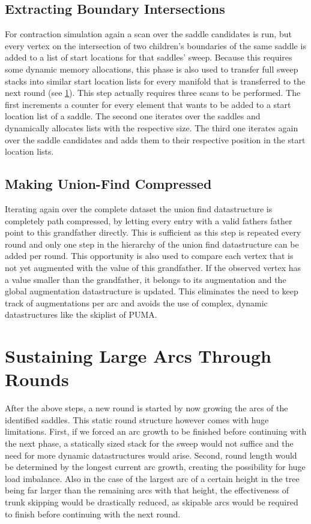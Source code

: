\documentclass[%
	paper=A4,					%
	twoside=true,				%
	openright,					%
	parskip=full,				%
	chapterprefix=true,			%
	11pt,						%
	headings=normal,			%
	bibliography=totoc,			%
	listof=totoc,				%
	titlepage=on,				%
	captions=tableabove,		%
	draft=false,				%
]{scrreprt}%
\begin{document}
\subsection{Extracting Boundary Intersections}
For contraction simulation again a scan over the saddle candidates is run, but every vertex on the intersection of two children's boundaries of the same saddle is added to a list of start locations for that saddles' sweep. Because this requires some dynamic memory allocations, this phase is also used to transfer full sweep stacks into similar start location lists for every manifold that is transferred to the next round (see \ref{ssec:num2}). This step actually requires three scans to be performed. The first increments a counter for every element that wants to be added to a start location list of a saddle. The second one iterates over the saddles and dynamically allocates lists with the respective size. The third one iterates again over the saddle candidates and adds them to their respective position in the start location lists.

\subsection{Making Union-Find Compressed}
Iterating again over the complete dataset the union find datastructure is completely path compressed, by letting every entry with a valid fathers father point to this grandfather directly. This is sufficient as this step is repeated every round and only one step in the hierarchy of the union find datastructure can be added per round. This opportunity is also used to compare each vertex that is not yet augmented with the value of this grandfather. If the observed vertex has a value smaller than the grandfather, it belongs to its augmentation and the global augmentation datastructure is updated. This eliminates the need to keep track of augmentations per arc and avoids the use of complex, dynamic datastructures like the skiplist of PUMA.

\section{Sustaining Large Arcs Through Rounds}\label{ssec:num2}
After the above steps, a new round is started by now growing the arcs of the identified saddles. This static round structure however comes with huge limitations. First, if we forced an arc growth to be finished before continuing with the next phase, a statically sized stack for the sweep would not suffice and the need for more dynamic datastructures would arise. Second, round length would be determined by the longest current arc growth, creating the possibility for huge load imbalance. Also in the case of the largest arc of a certain height in the tree being far larger than the remaining arcs with that height, the effectiveness of trunk skipping would be drastically reduced, as skipable arcs would be required to finish before continuing with the next round.
\end{document}
